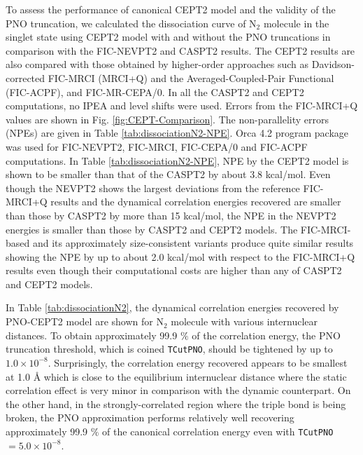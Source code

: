 \documentclass[aip,jcp,amsmath]{revtex4-1}
\begin{document}
%
To assess the performance of canonical CEPT2 model and the validity of the PNO truncation, we calculated the dissociation curve of N${}_2$ molecule in the singlet state using CEPT2 model with and without the PNO truncations in comparison with the FIC-NEVPT2 and CASPT2 results.
%
The CEPT2 results are also compared with those obtained by higher-order approaches such as Davidson-corrected FIC-MRCI (MRCI+Q) and the Averaged-Coupled-Pair Functional (FIC-ACPF), and FIC-MR-CEPA/0.
%
In all the CASPT2 and CEPT2 computations, no IPEA and level shifts were used.
%
Errors from the FIC-MRCI+Q values are shown in Fig. \ref{fig:CEPT-Comparison}.
%
The non-parallelity errors (NPEs) are given in Table \ref{tab:dissociationN2-NPE}.
%
Orca 4.2 program package\cite{WCMS:WCMS1327} was used for FIC-NEVPT2, FIC-MRCI,\cite{doi:10.1063/1.4959029} FIC-CEPA/0 and FIC-ACPF\cite{Gdanitz1988} computations.
%
In Table \ref{tab:dissociationN2-NPE}, NPE by the CEPT2 model is shown to be smaller than that of the CASPT2 by about 3.8 kcal/mol.
%
%
Even though the NEVPT2 shows the largest deviations from the reference FIC-MRCI+Q results and the dynamical correlation energies recovered are smaller than those by CASPT2 by more than 15 kcal/mol, the NPE in the NEVPT2 energies is smaller than those by CASPT2 and CEPT2 models.
%
The FIC-MRCI-based and its approximately size-consistent variants produce quite similar results showing the NPE by up to about 2.0 kcal/mol with respect to the FIC-MRCI+Q results even though their computational costs are higher than any of CASPT2 and CEPT2 models.

%
In Table \ref{tab:dissociationN2}, the dynamical correlation energies recovered by PNO-CEPT2 model are shown for N${}_2$ molecule with various internuclear distances.
%
To obtain approximately 99.9 $\%$ of the correlation energy, the PNO truncation threshold, which is coined {\tt TCutPNO}, should be tightened by up to $1.0\times 10^{-8}$.
%
Surprisingly, the correlation energy recovered appears to be smallest at 1.0 {\AA} which is close to the equilibrium internuclear distance where the static correlation effect is very minor in comparison with the dynamic counterpart.
%
On the other hand, in the strongly-correlated region where the triple bond is being broken, the PNO approximation performs relatively well recovering approximately 99.9 $\%$ of the canonical correlation energy even with {\tt TCutPNO}$=5.0\times 10^{-8}$.
\end{document}
